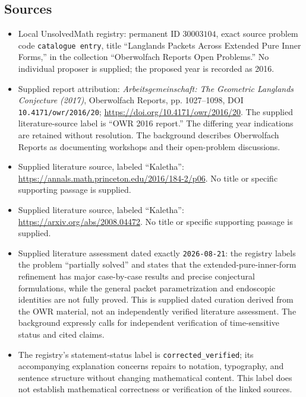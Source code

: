 \documentclass[11pt]{article}
\begin{document}
\subsection{Sources}
\begin{itemize}
\item Local UnsolvedMath registry: permanent ID \(30003104\), exact source problem code \texttt{catalogue entry}, title ``Langlands Packets Across Extended Pure Inner Forms,'' in the collection ``Oberwolfach Reports Open Problems.'' No individual proposer is supplied; the proposed year is recorded as 2016.
\item Supplied report attribution: \emph{Arbeitsgemeinschaft: The Geometric Langlands Conjecture (2017)}, Oberwolfach Reports, pp. 1027--1098, DOI \texttt{10.4171/owr/2016/20}; \url{https://doi.org/10.4171/owr/2016/20}. The supplied literature-source label is ``OWR 2016 report.'' The differing year indications are retained without resolution. The background describes Oberwolfach Reports as documenting workshops and their open-problem discussions.
\item Supplied literature source, labeled ``Kaletha'': \url{https://annals.math.princeton.edu/2016/184-2/p06}. No title or specific supporting passage is supplied.
\item Supplied literature source, labeled ``Kaletha'': \url{https://arxiv.org/abs/2008.04472}. No title or specific supporting passage is supplied.
\item Supplied literature assessment dated exactly \texttt{2026-08-21}: the registry labels the problem ``partially solved'' and states that the extended-pure-inner-form refinement has major case-by-case results and precise conjectural formulations, while the general packet parametrization and endoscopic identities are not fully proved. This is supplied dated curation derived from the OWR material, not an independently verified literature assessment. The background expressly calls for independent verification of time-sensitive status and cited claims.
\item The registry's statement-status label is \texttt{corrected\_verified}; its accompanying explanation concerns repairs to notation, typography, and sentence structure without changing mathematical content. This label does not establish mathematical correctness or verification of the linked sources.
\end{itemize}
\end{document}
